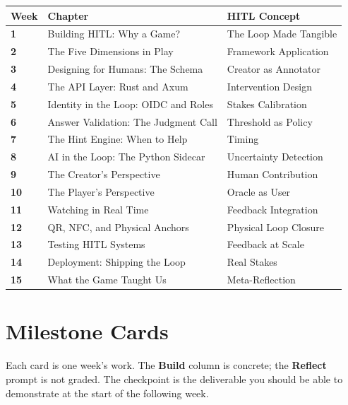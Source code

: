 \documentclass[
  11pt,
  oneside,
  DIV=12,
]{scrartcl}
\begin{document}
\begin{center}
\renewcommand{\arraystretch}{1.35}
\begin{tabularx}{\linewidth}{@{}>{\sffamily\bfseries\color{SpringMoss}}lX>{\small\color{SpringLeaf}\sffamily}l@{}}
\toprule
Week & Chapter & HITL Concept \\
\midrule
1  & Building HITL: Why a Game? & The Loop Made Tangible \\
2  & The Five Dimensions in Play & Framework Application \\
3  & Designing for Humans: The Schema & Creator as Annotator \\
4  & The API Layer: Rust and Axum & Intervention Design \\
5  & Identity in the Loop: OIDC and Roles & Stakes Calibration \\
6  & Answer Validation: The Judgment Call & Threshold as Policy \\
7  & The Hint Engine: When to Help & Timing \\
8  & AI in the Loop: The Python Sidecar & Uncertainty Detection \\
9  & The Creator's Perspective & Human Contribution \\
10 & The Player's Perspective & Oracle as User \\
11 & Watching in Real Time & Feedback Integration \\
12 & QR, NFC, and Physical Anchors & Physical Loop Closure \\
13 & Testing HITL Systems & Feedback at Scale \\
14 & Deployment: Shipping the Loop & Real Stakes \\
15 & What the Game Taught Us & Meta-Reflection \\
\bottomrule
\end{tabularx}
\end{center}

\clearpage

\section*{Milestone Cards}

Each card is one week's work. The \textbf{Build} column is concrete; the
\textbf{Reflect} prompt is not graded. The checkpoint is the deliverable you
should be able to demonstrate at the start of the following week.

\bigskip
\end{document}

